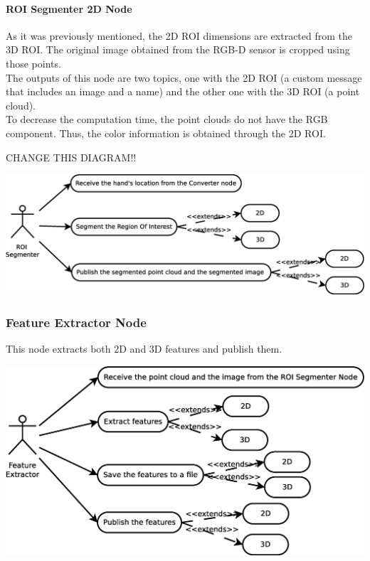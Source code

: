 \documentclass{article}
\begin{document}
\paragraph{ROI Segmenter 2D Node\\[0.5cm]}
As it was previously mentioned, the 2D ROI dimensions are extracted from the 3D ROI. The original image obtained from the RGB-D sensor is cropped using those points. 
\\
The outputs of this node are two topics, one with the 2D ROI (a custom message that includes an image and a name) and the other one with the 3D ROI (a point cloud).
\\
To decrease the computation time, the point clouds do not have the RGB component. Thus, the color information is obtained through the 2D ROI. 


\begin{huge}
CHANGE THIS DIAGRAM!!
\end{huge}

\begin{center}
	\includegraphics[scale=0.4]{img/diagrams/uc_roi_segmenter.eps}
\end{center}

\subsubsection{Feature Extractor Node}
This node extracts both 2D and 3D features and publish them. 

\begin{center}
	\includegraphics[scale=0.4]{img/diagrams/uc_feature_extractor.eps}
\end{center}
\end{document}
